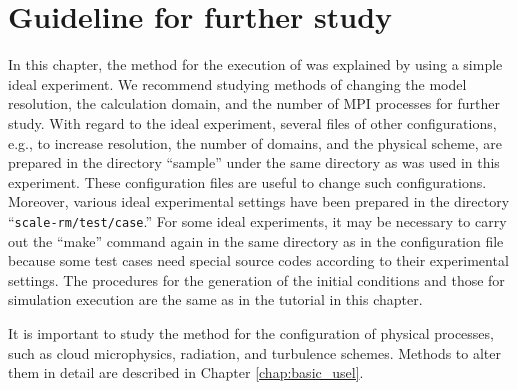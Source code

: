 \section{Guideline for further study} \label{sec:ideal_exp_last}

In this chapter,
the method for the execution of \scalerm was explained by using a simple ideal experiment. We recommend studying methods of changing the model resolution, the calculation domain, and the number of MPI processes for further study.  With regard to the ideal experiment, several files of other configurations,  e.g., to increase resolution, the number of domains, and the physical scheme, are prepared in the directory ``sample'' under the same directory as was used in this experiment.  These configuration files are useful to change such configurations.  Moreover, various ideal experimental settings  have been prepared in the directory ``\verb|scale-rm/test/case|.'' For some ideal experiments,  it may be necessary to carry out the ``make'' command again in the same directory as in the configuration file  because some test cases need special source codes according to their experimental settings. The procedures for the generation of the initial conditions and those for simulation execution are the same as in the tutorial in this chapter.

It is important to study the method for the configuration of physical processes, such as cloud microphysics, radiation, and turbulence schemes. Methods to alter them in detail are described in Chapter \ref{chap:basic_usel}.

